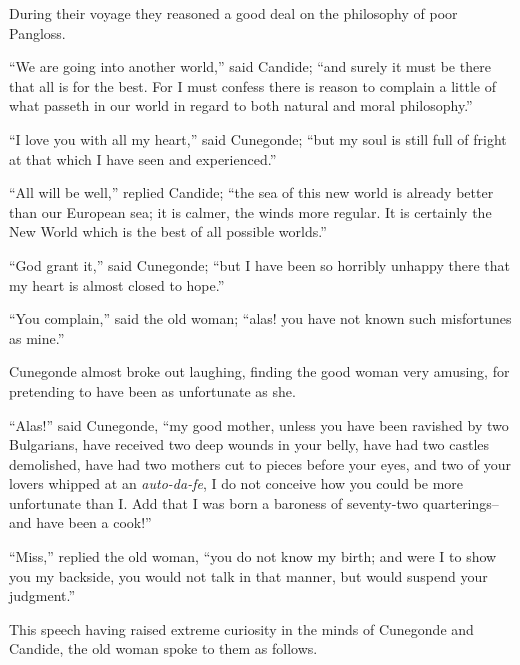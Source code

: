During their voyage they reasoned a good deal on the philosophy of poor Pangloss.

``We are going into another world,'' said Candide; ``and surely it must be there that all is for the best. For I must confess there is reason to complain a little of what passeth in our world in regard to both natural and moral philosophy.''

``I love you with all my heart,'' said Cunegonde; ``but my soul is still full of fright at that which I have seen and experienced.''

``All will be well,'' replied Candide; ``the sea of this new world is already better than our European sea; it is calmer, the winds more regular. It is certainly the New World which is the best of all possible worlds.''

``God grant it,'' said Cunegonde; ``but I have been so horribly unhappy there that my heart is almost closed to hope.''

``You complain,'' said the old woman; ``alas! you have not known such misfortunes as mine.''

Cunegonde almost broke out laughing, finding the good woman very amusing, for pretending to have been as unfortunate as she.

``Alas!'' said Cunegonde, ``my good mother, unless you have been ravished by two Bulgarians, have received two deep wounds in your belly, have had two castles demolished, have had two mothers cut to pieces before your eyes, and two of your lovers whipped at an \textit{auto-da-fe}, I do not conceive how you could be more unfortunate than I. Add that I was born a baroness of seventy-two quarterings--and have been a cook!''

``Miss,'' replied the old woman, ``you do not know my birth; and were I to show you my backside, you would not talk in that manner, but would suspend your judgment.''

This speech having raised extreme curiosity in the minds of Cunegonde and Candide, the old woman spoke to them as follows.


